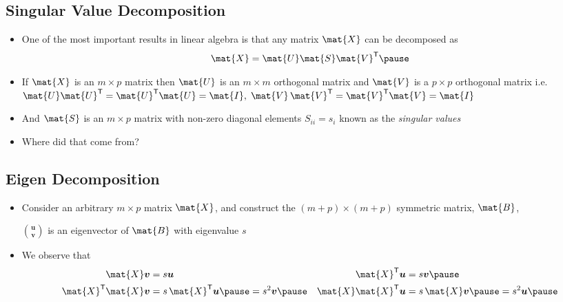 \begin{slide}
\section{Singular Value Decomposition}

\begin{PauseHighLight}
  \begin{itemize}
  \item One of the most important results in linear algebra is that
    any matrix $\mat{X}$ can be decomposed as
    \begin{align*}
      \mat{X} = \mat{U} \mat{S} \mat{V}^\tr\pause
    \end{align*}
  \item If $\mat{X}$ is an $m\times p$ matrix then $\mat{U}$ is an
    $m\times m$ orthogonal matrix and $\mat{V}$ is a $p\times p$
    orthogonal matrix\pause{} i.e. $\mat{U}\mat{U}^\tr =
    \mat{U}^\tr\mat{U} = \mat{I}, \; \mat{V}\,\mat{V}^\tr =
    \mat{V}^\tr\mat{V} = \mat{I}$\pauseb
  \item And $\mat{S}$ is an $m\times p$ matrix with non-zero diagonal
    elements $S_{ii} = s_i$ known as the \emph{singular values}\pause
  \item Where did that come from?\pauseb
  \end{itemize}
\end{PauseHighLight}

\end{slide}



\begin{slide}
\section[-2]{Eigen Decomposition}

\pb
\begin{itemize}\squeeze
\item Consider an arbitrary $m\times p$ matrix $\mat{X}$, and construct
  the $(m+p)\times(m+p)$ symmetric matrix, $\mat{B}$, \pauseh{}
  \vspace*{-1cm}
  \begin{center}
    \pause
  \end{center}
  \vspace*{-1cm}
  $\binom{\bm{u}}{\bm{v}}$ is an eigenvector of $\mat{B}$ with eigenvalue $s$\pause
\item We observe that
  \begin{align*}
    \mat{X} \bm{v} &= s \bm{u} &
    \mat{X}^\tr \bm{u} &= s \bm{v} \pause\\
    \mat{X}^\tr \mat{X} \bm{v} &= s\,\mat{X}^\tr\bm{u} \pause = s^2 \bm{v}\pause &
    \mat{X} \mat{X}^\tr \bm{u} &= s\,\mat{X}\bm{v}\pause = s^2 \bm{u}\pause
  \end{align*}
\end{itemize}

\end{slide}

